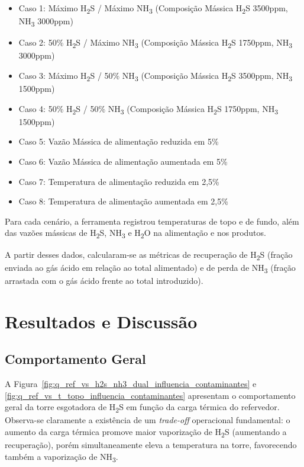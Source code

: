 \documentclass[10pt,a4paper]{article}
\begin{document}
\begin{itemize}[leftmargin=4em, itemsep=0pt]
  \item Caso 1: Máximo H\textsubscript{2}S / Máximo NH\textsubscript{3} (Composição Mássica H\textsubscript{2}S 3500ppm, NH\textsubscript{3} 3000ppm)
  \item Caso 2: 50\% H\textsubscript{2}S / Máximo NH\textsubscript{3} (Composição Mássica H\textsubscript{2}S 1750ppm, NH\textsubscript{3} 3000ppm)
  \item Caso 3: Máximo H\textsubscript{2}S / 50\% NH\textsubscript{3} (Composição Mássica H\textsubscript{2}S 3500ppm, NH\textsubscript{3} 1500ppm)
  \item Caso 4: 50\% H\textsubscript{2}S / 50\% NH\textsubscript{3} (Composição Mássica H\textsubscript{2}S 1750ppm, NH\textsubscript{3} 1500ppm)
  \item Caso 5: Vazão Mássica de alimentação reduzida em 5\%
  \item Caso 6: Vazão Mássica de alimentação aumentada em 5\%
  \item Caso 7: Temperatura de alimentação reduzida em 2,5\%
  \item Caso 8: Temperatura de alimentação aumentada em 2,5\%
\end{itemize}

Para cada cenário, a ferramenta registrou temperaturas de topo e de fundo, além das vazões mássicas de H\textsubscript{2}S, NH\textsubscript{3} e H\textsubscript{2}O na alimentação e nos produtos.

A partir desses dados, calcularam-se as métricas de recuperação de H\textsubscript{2}S (fração enviada ao gás ácido em relação ao total alimentado) e de perda de NH\textsubscript{3} (fração arrastada com o gás ácido frente ao total introduzido).

\section{Resultados e Discussão}\label{sec:resultados}

\subsection{Comportamento Geral}

A Figura~\ref{fig:q_ref_vs_h2s_nh3_dual_influencia_contaminantes} e \ref{fig:q_ref_vs_t_topo_influencia_contaminantes} apresentam o comportamento geral da torre esgotadora de H\textsubscript{2}S em função da carga térmica do refervedor. Observa-se claramente a existência de um \textit{trade-off} operacional fundamental: o aumento da carga térmica promove maior vaporização de H\textsubscript{2}S (aumentando a recuperação), porém simultaneamente eleva a temperatura na torre, favorecendo também a vaporização de NH\textsubscript{3}.
\end{document}

